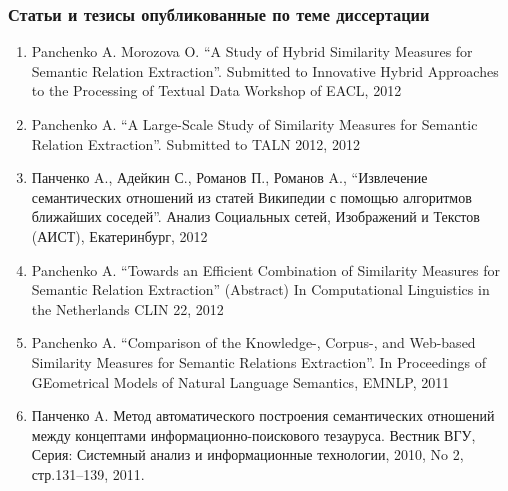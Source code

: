 \begin{frame}
\frametitle{Статьи и тезисы опубликованные по теме диссертации}


\begin{enumerate}
  \footnotesize
\item Panchenko A. Morozova O. “A Study of Hybrid Similarity Measures for Semantic Relation Extraction”. Submitted to Innovative Hybrid Approaches to the Processing of Textual Data Workshop of EACL, 2012
\item Panchenko A. “A Large-Scale Study of Similarity Measures for Semantic Relation Extraction”. Submitted to TALN 2012,  2012

\item Панченко A., Адейкин С., Романов П., Романов A., “Извлечение семантических отношений из статей Википедии с помощью алгоритмов ближайших соседей”. Анализ Социальных сетей, Изображений и Текстов (АИСТ), Екатеринбург, 2012

\item Panchenko A. “Towards an Efficient Combination of Similarity Measures for Semantic Relation Extraction” (Abstract) In Computational Linguistics in the Netherlands CLIN 22,  2012

\item Panchenko A. “Comparison of the Knowledge-, Corpus-, and Web-based Similarity Measures for Semantic Relations Extraction”. In Proceedings of GEometrical Models of Natural Language Semantics, EMNLP, 2011 

\item Панченко A. Метод автоматического построения семантических отношений между концептами информационно-поискового тезауруса. Вестник ВГУ, Серия: Системный анализ и информационные технологии, 2010, No 2, стр.131–139, 2011. 
 
\end{enumerate}

\end{frame}


